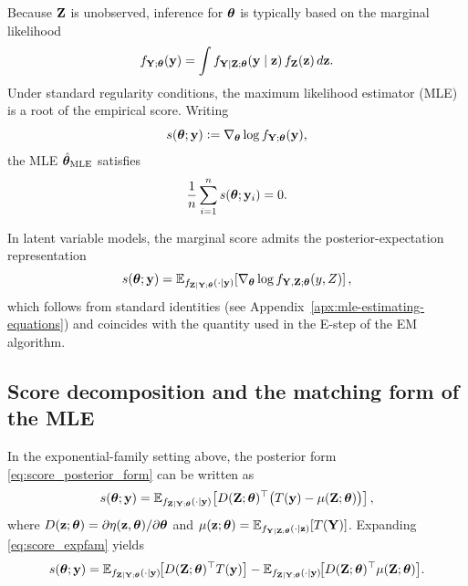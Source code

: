 \documentclass[twoside,11pt]{article}
\begin{document}
Because ${\bf Z}$ is unobserved, inference for ${\bm{\theta}}$ is typically based on the marginal likelihood
\[
f_{{\bf Y};{\bm{\theta}}}({\bf y})=\int f_{{\bf Y}\mid{\bf Z};{\bm{\theta}}}({\bf y}\mid{\bf z})\,f_{\bf Z}({\bf z})\,d{\bf z}.
\]
Under standard regularity conditions, the maximum likelihood estimator (MLE) is a root of
the empirical score. Writing
\[
s({\bm{\theta}};{\bf y}) \vcentcolon = \nabla_{\bm{\theta}} \log f_{{\bf Y};{\bm{\theta}}}({\bf y}),
\]
the MLE $\hat{{\bm{\theta}}}_{\mathrm{MLE}}$ satisfies
\begin{equation}
\frac{1}{n}\sum_{i=1}^n s({\bm{\theta}};{\bf y}_i)=0.
\label{eq:mle_score_eq}
\end{equation}

In latent variable models, the marginal score admits the posterior-expectation representation
\begin{equation}
s({\bm{\theta}};{\bf y})
=
\mathbb{E}_{f_{{\bf Z}\mid{\bf Y};{\bm{\theta}}}(\cdot\mid {\bf y})}
\!\left[
\nabla_{\bm{\theta}} \log f_{{\bf Y},{\bf Z};{\bm{\theta}}}(y,Z)
\right],
\label{eq:score_posterior_form}
\end{equation}
which follows from standard identities (see Appendix~\ref{apx:mle-estimating-equations}) and
coincides with the quantity used in the E-step of the EM algorithm.

\subsection{Score decomposition and the matching form of the MLE}

In the exponential-family setting above, the posterior form \eqref{eq:score_posterior_form}
can be written as
\begin{equation}
s({\bm{\theta}};{\bf y})
=
\mathbb{E}_{f_{{\bf Z}\mid{\bf Y};{\bm{\theta}}}(\cdot\mid {\bf y})}
\!\left[
D({\bf Z};{\bm{\theta}})^\top\bigl(T({\bf y})-\mu({\bf Z};{\bm{\theta}})\bigr)
\right],
\label{eq:score_expfam}
\end{equation}
where $D({\bf z};{\bm{\theta}})=\partial\eta({\bf z},{\bm{\theta}})/\partial{\bm{\theta}}$ and
$\mu({\bf z};{\bm{\theta}})=\mathbb{E}_{f_{{\bf Y}\mid{\bf Z};{\bm{\theta}}}(\cdot\mid {\bf z})}[T({\bf Y})]$.
Expanding \eqref{eq:score_expfam} yields
\begin{equation}
s({\bm{\theta}};{\bf y})
=
\mathbb{E}_{f_{{\bf Z}\mid{\bf Y};{\bm{\theta}}}(\cdot\mid {\bf y})}\!\big[D({\bf Z};{\bm{\theta}})^\top T({\bf y})\big]
-
\mathbb{E}_{f_{{\bf Z}\mid{\bf Y};{\bm{\theta}}}(\cdot\mid {\bf y})}\!\big[D({\bf Z};{\bm{\theta}})^\top \mu({\bf Z};{\bm{\theta}})\big].
\label{eq:score_two_terms}
\end{equation}
\end{document}
